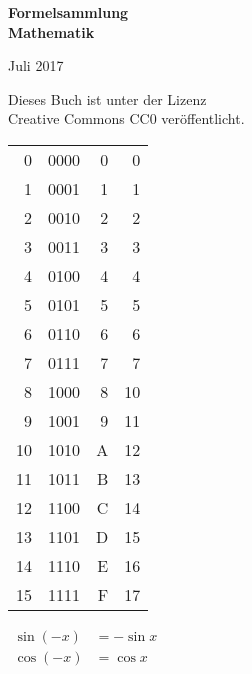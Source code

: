 \documentclass[a4paper,10pt,fleqn,twocolumn,twoside,openany]{book}
\numberwithin{equation}{chapter}
\newenvironment{ttsection}{\ttfamily}{\par}
\theoremstyle{Definition}
\begin{document}
\setlength{\abovedisplayskip}{6pt}
\setlength{\belowdisplayskip}{6pt}
\setlength{\abovedisplayshortskip}{6pt}
\setlength{\belowdisplayshortskip}{6pt}

\begin{titlepage}
\centering
\phantom{x}

\vspace{20em}
{\noindent\Huge\sffamily\textbf{Formelsammlung\\
Mathematik}}

\vspace{2em}
{\Large Juli 2017}\\
\end{titlepage}

\thispagestyle{empty}

\noindent
Dieses Buch ist unter der Lizenz\\
Creative Commons CC0 veröffentlicht.
\vspace{8em}

\noindent
\begin{ttsection}
\begin{tabular}{r|r|r|r}
 0 & 0000 & 0 &  0\\
 1 & 0001 & 1 &  1\\
 2 & 0010 & 2 &  2\\
 3 & 0011 & 3 &  3\\
\noalign{\vspace{1em}}
 4 & 0100 & 4 &  4\\
 5 & 0101 & 5 &  5\\
 6 & 0110 & 6 &  6\\
 7 & 0111 & 7 &  7\\
\noalign{\vspace{1em}}
 8 & 1000 & 8 & 10\\
 9 & 1001 & 9 & 11\\
10 & 1010 & A & 12\\
11 & 1011 & B & 13\\
\noalign{\vspace{1em}}
12 & 1100 & C & 14\\
13 & 1101 & D & 15\\
14 & 1110 & E & 16\\
15 & 1111 & F & 17
\end{tabular}
\end{ttsection}

\newpage
\noindent
$\!\begin{aligned}
\sin(-x) &= -\sin x\\
\cos(-x) &= \cos x
\end{aligned}$
\vspace{1em}
\end{document}
